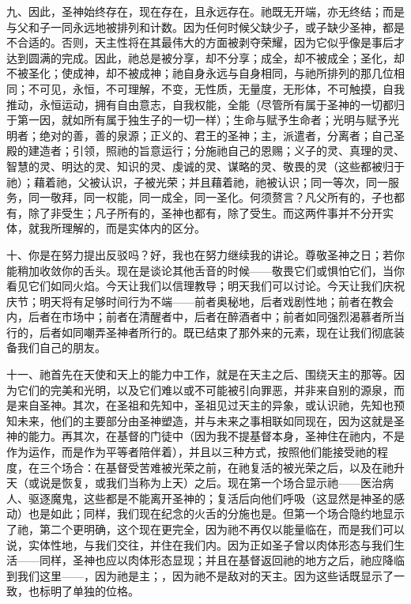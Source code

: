 九、因此，圣神始终存在，现在存在，且永远存在。祂既无开端，亦无终结；而是与父和子一同永远地被排列和计数。因为任何时候父缺少子，或子缺少圣神，都是不合适的。否则，天主性将在其最伟大的方面被剥夺荣耀，因为它似乎像是事后才达到圆满的完成。因此，祂总是被分享，却不分享；成全，却不被成全；圣化，却不被圣化；使成神，却不被成神；祂自身永远与自身相同，与祂所排列的那几位相同；不可见，永恒，不可理解，不变，无性质，无量度，无形体，不可触摸，自我推动，永恒运动，拥有自由意志，自我权能，全能（尽管所有属于圣神的一切都归于第一因，就如所有属于独生子的一切一样）；生命与赋予生命者；光明与赋予光明者；绝对的善，善的泉源；正义的、君王的圣神；主，派遣者，分离者；自己圣殿的建造者；引领，照祂的旨意运行；分施祂自己的恩赐；义子的灵、真理的灵、智慧的灵、明达的灵、知识的灵、虔诚的灵、谋略的灵、敬畏的灵（这些都被归于祂）；藉着祂，父被认识，子被光荣；并且藉着祂，祂被认识；同一等次，同一服务，同一敬拜，同一权能，同一成全，同一圣化。何须赘言？凡父所有的，子也都有，除了非受生；凡子所有的，圣神也都有，除了受生。而这两件事并不分开实体，就我所理解的，而是实体内的区分。\par

十、你是在努力提出反驳吗？好，我也在努力继续我的讲论。尊敬圣神之日；若你能稍加收敛你的舌头。现在是谈论其他舌音的时候——敬畏它们或惧怕它们，当你看见它们如同火焰。今天让我们以信理教导；明天我们可以讨论。今天让我们庆祝庆节；明天将有足够时间行为不端——前者奥秘地，后者戏剧性地；前者在教会内，后者在市场中；前者在清醒者中，后者在醉酒者中；前者如同强烈渴慕者所当行的，后者如同嘲弄圣神者所行的。既已结束了那外来的元素，现在让我们彻底装备我们自己的朋友。\par

十一、祂首先在天使和天上的能力中工作，就是在天主之后、围绕天主的那等。因为它们的完美和光明，以及它们难以或不可能被引向罪恶，并非来自别的源泉，而是来自圣神。其次，在圣祖和先知中，圣祖见过天主的异象，或认识祂，先知也预知未来，他们的主要部分由圣神塑造，并与未来之事相联如同现在，因为这就是圣神的能力。再其次，在基督的门徒中（因为我不提基督本身，圣神住在祂内，不是作为运作，而是作为平等者陪伴着），并且以三种方式，按照他们能接受祂的程度，在三个场合：在基督受苦难被光荣之前，在祂复活的被光荣之后，以及在祂升天（或说是恢复，或我们当称为上天）之后。现在第一个场合显示祂——医治病人、驱逐魔鬼，这些都是不能离开圣神的；复活后向他们呼吸（这显然是神圣的感动）也是如此；同样，我们现在纪念的火舌的分施也是。但第一个场合隐约地显示了祂，第二个更明确，这个现在更完全，因为祂不再仅以能量临在，而是我们可以说，实体性地，与我们交往，并住在我们内。因为正如圣子曾以肉体形态与我们生活——同样，圣神也应以肉体形态显现；并且在基督返回祂的地方之后，祂应降临到我们这里——，因为祂是主；，因为祂不是敌对的天主。因为这些话既显示了一致，也标明了单独的位格。\par


